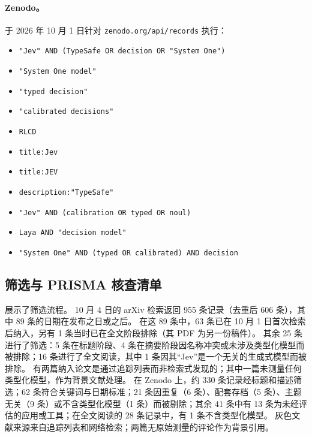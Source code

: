 \paragraph{Zenodo。}
于 2026 年 10 月 1 日针对 \texttt{zenodo.org/api/records} 执行：
\begin{itemize}[nosep,leftmargin=1.5em]
  \item \nolinkurl{"Jev" AND (TypeSafe OR decision OR "System One")}
  \item \nolinkurl{"System One model"}
  \item \nolinkurl{"typed decision"}
  \item \nolinkurl{"calibrated decisions"}
  \item \nolinkurl{RLCD}
  \item \nolinkurl{title:Jev}
  \item \nolinkurl{title:JEV}
  \item \nolinkurl{description:"TypeSafe"}
  \item \nolinkurl{"Jev" AND (calibration OR typed OR noul)}
  \item \nolinkurl{Laya AND "decision model"}
  \item \nolinkurl{"System One" AND (typed OR calibrated) AND decision}
\end{itemize}


\subsection{筛选与 PRISMA 核查清单}
\label{app:prisma}
 展示了筛选流程。
10 月 4 日的 arXiv 检索返回 955 条记录（去重后 606 条），其中 89 条的日期在发布之日或之后。
在这 89 条中，63 条已在 10 月 1 日首次检索后纳入，另有 1 条当时已在全文阶段排除（其 PDF 为另一份稿件）。
其余 25 条进行了筛选：5 条在标题阶段、4 条在摘要阶段因名称冲突或未涉及类型化模型而被排除；16 条进行了全文阅读，其中 1 条因其“Jev”是一个无关的生成式模型而被排除。
有两篇纳入论文是通过追踪列表而非检索式发现的；其中一篇未测量任何类型化模型，作为背景文献处理。
在 Zenodo 上，约 330 条记录经标题和描述筛选；62 条符合关键词与日期标准；21 条因重复（6 条）、配套存档（5 条）、主题无关（9 条）或不含类型化模型（1 条）而被剔除；其余 41 条中有 13 条为未经评估的应用或工具；在全文阅读的 28 条记录中，有 1 条不含类型化模型。
灰色文献来源来自追踪列表和网络检索；两篇无原始测量的评论作为背景引用。

